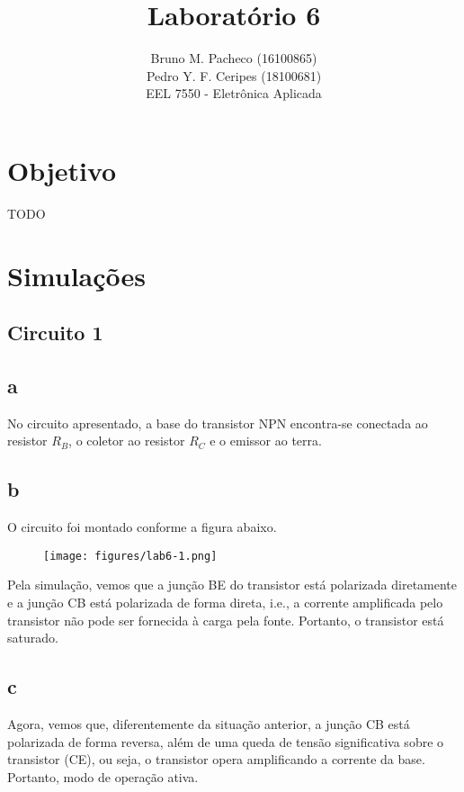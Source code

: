 \documentclass[a4paper]{report}
\begin{document}
 
\title{Laboratório 6}
\author{Bruno M. Pacheco (16100865)\\
Pedro Y. F. Ceripes (18100681) \\
EEL 7550 - Eletrônica Aplicada}
 
\maketitle
\section*{Objetivo}
 
TODO
 
\section*{Simulações}

\subsection*{Circuito 1}
\subsection*{a}

No circuito apresentado, a base do transistor NPN encontra-se conectada ao resistor $R_B$, o coletor ao resistor $R_C$ e o emissor ao terra.

\subsection*{b}

O circuito foi montado conforme a figura abaixo.

\begin{figure}[H]
    \centering
    \texttt{[image: figures/lab6-1.png]}
\end{figure}

Pela simulação, vemos que a junção BE do transistor está polarizada diretamente e a junção CB está polarizada de forma direta, i.e., a corrente amplificada pelo transistor não pode ser fornecida à carga pela fonte. Portanto, o transistor está saturado.

\subsection*{c}

Agora, vemos que, diferentemente da situação anterior, a junção CB está polarizada de forma reversa, além de uma queda de tensão significativa sobre o transistor (CE), ou seja, o transistor opera amplificando a corrente da base. Portanto, modo de operação ativa.
\end{document}
